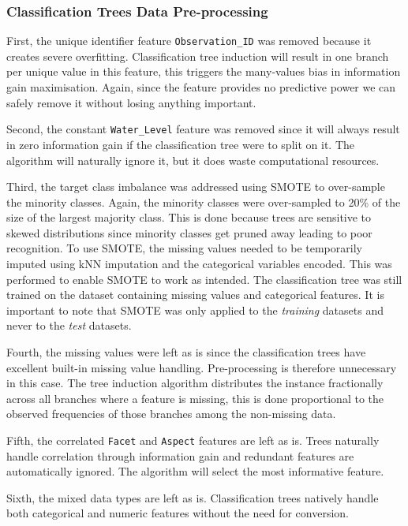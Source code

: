 \documentclass[10pt, conference]{IEEEtran}
\begin{document}
\subsubsection{Classification Trees Data Pre-processing}

First, the unique identifier feature \texttt{Observation\_ID} was removed because it creates severe overfitting. Classification tree induction will result in one branch per unique value in this feature, this triggers the many-values bias in information gain maximisation. Again, since the feature provides no predictive power we can safely remove it without losing anything important.

Second, the constant \texttt{Water\_Level} feature was removed since it will always result in zero information gain if the classification tree were to split on it. The algorithm will naturally ignore it, but it does waste computational resources.

Third, the target class imbalance was addressed using SMOTE to over-sample the minority classes. Again, the minority classes were over-sampled to 20\% of the size of the largest majority class. This is done because trees are sensitive to skewed distributions since minority classes get pruned away leading to poor recognition. To use SMOTE, the missing values needed to be temporarily imputed using kNN imputation and the categorical variables encoded. This was performed to enable SMOTE to work as intended. The classification tree was still trained on the dataset containing missing values and categorical features. It is important to note that SMOTE was only applied to the \textit{training} datasets and never to the \textit{test} datasets.

Fourth, the missing values were left as is since the classification trees have excellent built-in missing value handling. Pre-processing is therefore unnecessary in this case. The tree induction algorithm distributes the instance fractionally across all branches where a feature is missing, this is done proportional to the observed frequencies of those branches among the non-missing data.

Fifth, the correlated \texttt{Facet} and \texttt{Aspect} features are left as is. Trees naturally handle correlation through information gain and redundant features are automatically ignored. The algorithm will select the most informative feature.

Sixth, the mixed data types are left as is. Classification trees natively handle both categorical and numeric features without the need for conversion.
\end{document}
